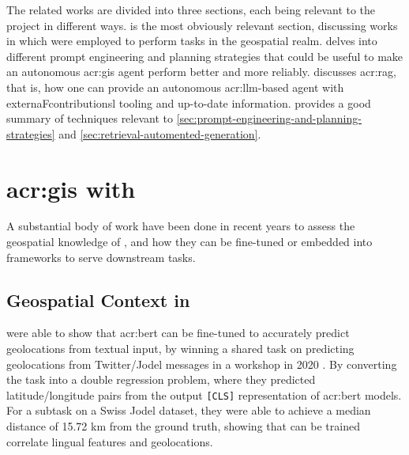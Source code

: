 The related works are divided into three sections, each being relevant to the project in different ways.  is the most obviously relevant section, discussing works in which  were employed to perform tasks in the geospatial realm.  delves into different prompt engineering and planning strategies that could be useful to make an autonomous \acrshort{acr:gis} agent perform better and more reliably.  discusses \gls{acr:rag}, that is, how one can provide an autonomous \acrshort{acr:llm}-based agent with externaFcontributionsl tooling and up-to-date information. \cite{wengLLMPoweredAutonomous2023} provides a good summary of techniques relevant to \autoref{sec:prompt-engineering-and-planning-strategies} and \autoref{sec:retrieval-automented-generation}.



\section[GIS with LLMs]{\acrshort{acr:gis} with }\label{sec:gis-with-llms}

A substantial body of work have been done in recent years to assess the geospatial knowledge of , and how they can be fine-tuned or embedded into frameworks to serve downstream tasks.

\subsection[]{Geospatial Context in }

\cite{scherrerHeLjuVarDial20202020} were able to show that \acrshort{acr:bert} can be fine-tuned to accurately predict geolocations from textual input, by winning a shared task on predicting geolocations from Twitter/Jodel messages in a workshop in 2020 \citep{gamanReportVarDialEvaluation2020}. By converting the task into a double regression problem, where they predicted latitude/longitude pairs from the output \texttt{[CLS]} representation of \acrshort{acr:bert} models. For a subtask on a Swiss Jodel dataset, they were able to achieve a median distance of 15.72 km from the ground truth, showing that  can be trained correlate lingual features and geolocations.

